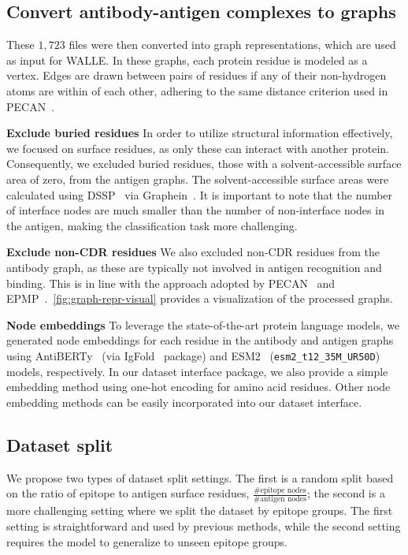 \documentclass[11pt]{article}
\begin{document}
\subsection{Convert antibody-antigen complexes to graphs}

These $1,723$ files were then converted into graph representations, which are used as input for WALLE.
In these graphs, each protein residue is modeled as a vertex.
Edges are drawn between pairs of residues if any of their non-hydrogen atoms are within  of each other, adhering to the same distance criterion used in PECAN~\citep{pecan2020}.

\textbf{Exclude buried residues} In order to utilize structural information effectively, we focused on surface residues, as only these can interact with another protein.
Consequently, we excluded buried residues, those with a solvent-accessible surface area of zero, from the antigen graphs.
The solvent-accessible surface areas were calculated using DSSP~\citep{dssp} via Graphein~\citep{graphein}.
It is important to note that the number of interface nodes are much smaller than the number of non-interface nodes in the antigen, making the classification task more challenging.

\textbf{Exclude non-CDR residues} We also excluded non-CDR residues from the antibody graph, as these are typically not involved in antigen recognition and binding.
This is in line with the approach adopted by PECAN~\citep{pecan2020} and EPMP~\citep{epmp2021}.~\cref{fig:graph-repr-visual} provides a visualization of the processed graphs.


\textbf{Node embeddings} To leverage the state-of-the-art protein language models, we generated node embeddings for each residue in the antibody and antigen graphs using AntiBERTy~\citep{antiberty} (via IgFold~\citep{IgFold} package) and ESM2~\citep{ESM2} (\texttt{esm2\_t12\_35M\_UR50D}) models, respectively.
In our dataset interface package, we also provide a simple embedding method using one-hot encoding for amino acid residues.
Other node embedding methods can be easily incorporated into our dataset interface.

\subsection{Dataset split}\label{sec:dataset-split}

We propose two types of dataset split settings. The first is a random split based on the ratio of epitope to antigen surface residues, $\frac{\#\text{epitope nodes}}{\#\text{antigen nodes}}$; the second is a more challenging setting where we split the dataset by epitope groups. The first setting is straightforward and used by previous methods, while the second setting requires the model to generalize to unseen epitope groups.
\end{document}
